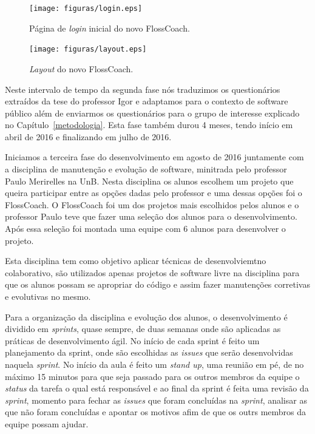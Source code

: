 \begin{figure}[h]
	\centering
	\label{fig:prototipo}
		\texttt{[image: figuras/login.eps]}
	\caption{Página de \textit{login} inicial do novo FlossCoach.}
\end{figure}


\begin{figure}[h]
	\centering
	\label{fig:prototipo}
		\texttt{[image: figuras/layout.eps]}
	\caption{\textit{Layout} do novo FlossCoach.}
\end{figure}


Neste intervalo de tempo da segunda fase nós traduzimos os questionários extraídos
da tese do professor Igor e adaptamos para o contexto de software público além de 
enviarmos os questionários para o grupo de interesse explicado no Capítulo~\ref{metodologia}.
Esta fase também durou 4 meses, tendo início em abril de 2016 e finalizando em julho de 2016.

Iniciamos a terceira fase do desenvolvimento em agosto de 2016 juntamente com a disciplina 
de manutenção e evolução de software, minitrada pelo professor Paulo Merirelles na UnB. 
Nesta disciplina os alunos escolhem um projeto que queira participar entre as opções 
dadas pelo professor e uma dessas opções foi o FlossCoach. O FlossCoach foi um dos 
projetos mais escolhidos pelos alunos e o professor Paulo teve que fazer uma seleção
dos alunos para o desenvolvimento. Após essa seleção foi montada uma equipe com
6 alunos para desenvolver o projeto.

Esta disciplina tem como objetivo aplicar técnicas de desenvolviemtno colaborativo,
são utilizados apenas projetos de software livre na disciplina para que os alunos 
possam se apropriar do código e assim fazer manutenções corretivas e evolutivas no
mesmo.

Para a organização da disciplina e evolução dos alunos, o desenvolvimento é dividido
em \textit{sprints}, quase sempre, de duas semanas onde são aplicadas as práticas de 
desenvolvimento ágil. No início de cada sprint é feito um planejamento da sprint, 
onde são escolhidas as \textit{issues} que serão desenvolvidas naquela \textit{sprint}.
No início da aula é feito um \textit{stand up}, uma reunião em pé, de no máximo 15
minutos para que seja passado para os outros membros da equipe o \textit{status} da
tarefa o qual está responsável e ao final da sprint é feita uma revisão da \textit{sprint},
momento para fechar as \textit{issues} que foram concluídas na \textit{sprint}, 
analisar as que não foram concluídas e apontar os motivos afim de que os outrs membros
da equipe possam ajudar.

